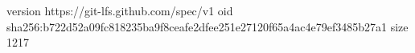 version https://git-lfs.github.com/spec/v1
oid sha256:b722d52a09fc818235ba9f8ceafe2dfee251e27120f65a4ac4e79ef3485b27a1
size 1217
